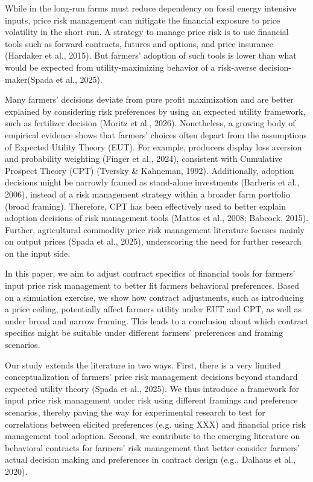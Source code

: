 \documentclass[
]{article}
\begin{document}
While in the long-run farms must reduce dependency on fossil energy
intensive inputs, price risk management can mitigate the financial
exposure to price volatility in the short run. A strategy to manage
price risk is to use financial tools such as forward contracts, futures
and options, and price insurance (Hardaker et al., 2015). But farmers'
adoption of such tools is lower than what would be expected from
utility-maximizing behavior of a risk-averse decision-maker(Spada et
al., 2025).

Many farmers' decisions deviate from pure profit maximization and are
better explained by considering risk preferences by using an expected
utility framework, such as fertilizer decision (Moritz et al., 2026).
Nonetheless, a growing body of empirical evidence shows that farmers'
choices often depart from the assumptions of Expected Utility Theory
(EUT). For example, producers display loss aversion and probability
weighting (Finger et al., 2024), consistent with Cumulative Prospect
Theory (CPT) (Tversky \& Kahneman, 1992). Additionally, adoption
decisions might be narrowly framed as stand-alone investments (Barberis
et al., 2006), instead of a risk management strategy within a broader
farm portfolio (broad framing). Therefore, CPT has been effectively used
to better explain adoption decisions of risk management tools (Mattos et
al., 2008; Babcock, 2015). Further, agricultural commodity price risk
management literature focuses mainly on output prices (Spada et al.,
2025), underscoring the need for further research on the input side.

In this paper, we aim to adjust contract specifics of financial tools
for farmers' input price risk management to better fit
farmers\textquotesingle{} behavioral preferences. Based on a simulation
exercise, we show how contract adjustments, such as introducing a price
ceiling, potentially affect farmers utility under EUT and CPT, as well
as under broad and narrow framing. This leads to a conclusion about
which contract specifics might be suitable under different farmers'
preferences and framing scenarios.

Our study extends the literature in two ways. First, there is a very
limited conceptualization of farmers' price risk management decisions
beyond standard expected utility theory (Spada et al., 2025). We thus
introduce a framework for input price risk management under risk using
different framings and preference scenarios, thereby paving the way for
experimental research to test for correlations between elicited
preferences (e.g. using XXX) and financial price risk management tool
adoption. Second, we contribute to the emerging literature on behavioral
contracts for farmers' risk management that better consider farmers'
actual decision making and preferences in contract design (e.g., Dalhaus
et al., 2020).
\end{document}
